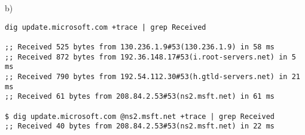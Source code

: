 b)\begin{verbatim}
dig update.microsoft.com +trace | grep Received

;; Received 525 bytes from 130.236.1.9#53(130.236.1.9) in 58 ms
;; Received 872 bytes from 192.36.148.17#53(i.root-servers.net) in 5 ms
;; Received 790 bytes from 192.54.112.30#53(h.gtld-servers.net) in 21 ms
;; Received 61 bytes from 208.84.2.53#53(ns2.msft.net) in 61 ms

$ dig update.microsoft.com @ns2.msft.net +trace | grep Received
;; Received 40 bytes from 208.84.2.53#53(ns2.msft.net) in 22 ms
\end{verbatim}



